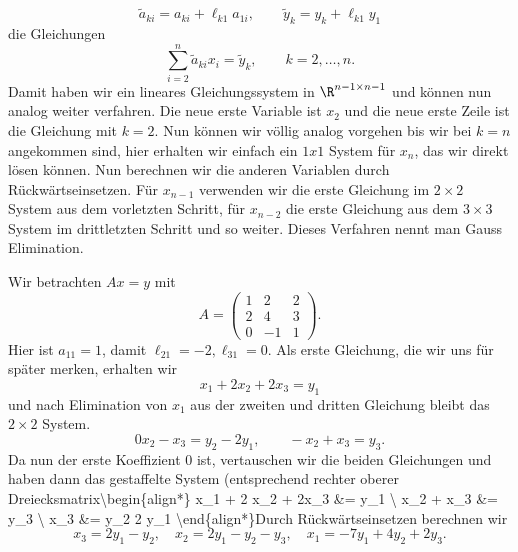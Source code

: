 \documentclass[letterpaper,10pt,english]{jupyterBook}
\begin{document}
\begin{equation*}
\tilde a_{ki} = a_{ki} + \ell_{k1} a_{1i}, \qquad \tilde y_k = y_k + \ell_{k1} y_1
\end{equation*}
die Gleichungen
\begin{equation*}
 \sum_{i=2}^n \tilde a_{ki} x_i = \tilde y_k, \qquad k=2,\ldots,n.
\end{equation*}
Damit haben wir ein lineares Gleichungssystem in \(\R^{n-1 \times n-1}\) und können nun analog weiter verfahren. Die neue erste Variable ist \(x_2\) und die neue erste Zeile ist die Gleichung mit \(k=2\). Nun können wir völlig analog vorgehen bis wir bei \(k=n\) angekommen sind, hier erhalten wir einfach ein \(1x1\) System für \(x_n\), das wir direkt lösen können. Nun berechnen wir die anderen Variablen durch Rückwärtseinsetzen. Für \(x_{n-1}\) verwenden wir die erste Gleichung im \(2 \times 2\) System aus dem vorletzten Schritt, für \(x_{n-2}\) die erste Gleichung aus dem \(3 \times 3\) System im drittletzten Schritt und so weiter.  Dieses Verfahren nennt man Gauss Elimination.
\label{vektorraeume/LGS:example-20}
\begin{example}{}{}



Wir betrachten \(Ax=y\) mit
\begin{equation*}
 A = \left( \begin{matrix} 1 & 2 & 2 \\ 2 & 4 & 3 \\ 0 & -1 & 1 \end{matrix} \right).
\end{equation*}
Hier ist \(a_{11}=1\), damit \(\ell_{21} = -2, \ell_{31} = 0. \) Als erste Gleichung, die wir uns für später merken, erhalten wir
\begin{equation*}
 x_1 + 2 x_2 + 2x_3 = y_1
\end{equation*}
und nach Elimination von \(x_1\) aus der zweiten und dritten Gleichung bleibt das \(2 \times 2 \) System.
\begin{equation*}
 0 x_2 -x_3 = y_2 -2 y_1, \qquad -x_2 + x_3 = y_3.
\end{equation*}
Da nun der erste Koeffizient \(0\) ist, vertauschen wir die beiden Gleichungen und haben dann das gestaffelte System (entsprechend rechter oberer Dreiecksmatrix\textbackslash{}begin\{align*\}
x\_1 + 2 x\_2 + 2x\_3 \&= y\_1 \textbackslash{}  x\_2 + x\_3 \&= y\_3 \textbackslash{}
 x\_3 \&= y\_2  2 y\_1
\textbackslash{}end\{align*\}Durch Rückwärtseinsetzen berechnen wir
\begin{equation*}
 x_3=2y_1 - y_2, \quad x_2 = 2 y_1 -y_2 -y_3, \quad x_1 = - 7 y_1 + 4y_2 +2 y_3.
\end{equation*}\end{example}
\end{document}
